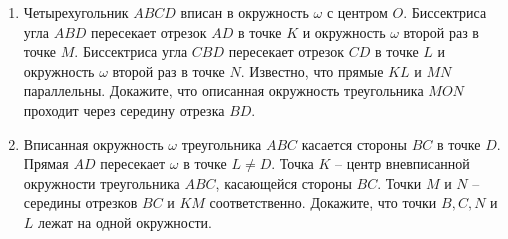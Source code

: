 \documentclass{article}
\begin{document}
\begin{enumerate}[label*=\protect\fbox{\arabic{enumi}}]
\item Четырехугольник $ABCD$ вписан в окружность $\omega$ с центром $O$. Биссектриса угла $ABD$ пересекает отрезок $AD$ в точке $K$ и окружность $\omega$ второй раз в точке $M$. Биссектриса угла $CBD$
пересекает отрезок $CD$ в точке $L$ и окружность $\omega$ второй раз в точке $N$. Известно, что прямые
$KL$ и $MN$ параллельны. Докажите, что описанная окружность треугольника $MON$ проходит через
середину отрезка $BD$.

\item Вписанная окружность $\omega$ треугольника $ABC$ касается стороны $BC$ в точке $D$.
Прямая $AD$ пересекает $\omega$ в точке $L \neq D$. Точка $K$ – центр вневписанной окружности
треугольника $ABC$, касающейся стороны $BC$. Точки $M$ и $N$ – середины отрезков $BC$
и $KM$ соответственно. Докажите, что точки $B, C, N$ и $L$ лежат на одной окружности.



\end{enumerate}
\end{document}
